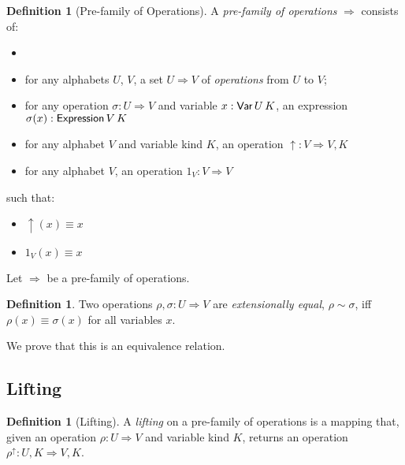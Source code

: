 \documentclass{article}
\theoremstyle{definition}
\newtheorem{df}[lm]{Definition}
\begin{document}
\begin{df}[Pre-family of Operations]
 A \emph{pre-family of operations} $\Rightarrow$ consists of:
 \begin{itemize}
  \item   \item for any alphabets $U$, $V$, a set $U \Rightarrow V$ of \emph{operations} from $U$ to $V$;
  \item for any operation $\sigma : U \Rightarrow V$ and variable $x : \AgdaDatatype{Var} \, U \, K$, an expression $\sigma(x) : \AgdaFunction{Expression} \,
  V \, K$ %
  \item for any alphabet $V$ and variable kind $K$, an operation $\uparrow : V \Rightarrow V , K$
  \item for any alphabet $V$, an operation $1_V : V \Rightarrow V$
 \end{itemize}
 such that:
 \begin{itemize}
  \item $\uparrow(x) \equiv x$
  \item $1_V(x) \equiv x$
 \end{itemize}
\end{df}


Let $\Rightarrow$ be a pre-family of operations.

\begin{df}
 Two operations $\rho, \sigma : U \Rightarrow V$ are \emph{extensionally equal}, $\rho \sim \sigma$, iff $\rho(x) \equiv \sigma(x)$ for all variables $x$.
\end{df}

We prove that this is an equivalence relation.


\subsection{Lifting}

\begin{df}[Lifting]
 A \emph{lifting} on a pre-family of operations is a mapping that, given an operation $\rho : U \Rightarrow V$ and variable kind $K$,
 returns an operation $\rho^\uparrow : U , K \Rightarrow V , K$.
\end{df}

\end{document}
